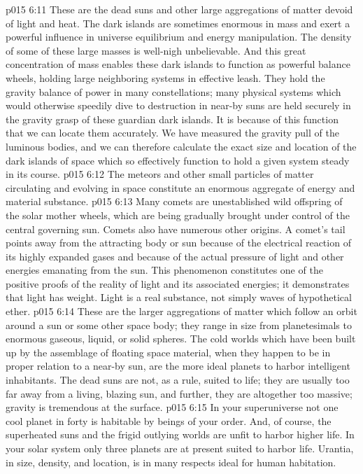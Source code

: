 \vs p015 6:11 \pc {} These are the dead suns and other large aggregations of matter devoid of light and heat. The dark islands are sometimes enormous in mass and exert a powerful influence in universe equilibrium and energy manipulation. The density of some of these large masses is well\hyp{}nigh unbelievable. And this great concentration of mass enables these dark islands to function as powerful balance wheels, holding large neighboring systems in effective leash. They hold the gravity balance of power in many constellations; many physical systems which would otherwise speedily dive to destruction in near\hyp{}by suns are held securely in the gravity grasp of these guardian dark islands. It is because of this function that we can locate them accurately. We have measured the gravity pull of the luminous bodies, and we can therefore calculate the exact size and location of the dark islands of space which so effectively function to hold a given system steady in its course.
\vs p015 6:12 \pc {} The meteors and other small particles of matter circulating and evolving in space constitute an enormous aggregate of energy and material substance.
\vs p015 6:13 Many comets are unestablished wild offspring of the solar mother wheels, which are being gradually brought under control of the central governing sun. Comets also have numerous other origins. A comet’s tail points away from the attracting body or sun because of the electrical reaction of its highly expanded gases and because of the actual pressure of light and other energies emanating from the sun. This phenomenon constitutes one of the positive proofs of the reality of light and its associated energies; it demonstrates that light has weight. Light is a real substance, not simply waves of hypothetical ether.
\vs p015 6:14 \pc {} These are the larger aggregations of matter which follow an orbit around a sun or some other space body; they range in size from planetesimals to enormous gaseous, liquid, or solid spheres. The cold worlds which have been built up by the assemblage of floating space material, when they happen to be in proper relation to a near\hyp{}by sun, are the more ideal planets to harbor intelligent inhabitants. The dead suns are not, as a rule, suited to life; they are usually too far away from a living, blazing sun, and further, they are altogether too massive; gravity is tremendous at the surface.
\vs p015 6:15 In your superuniverse not one cool planet in forty is habitable by beings of your order. And, of course, the superheated suns and the frigid outlying worlds are unfit to harbor higher life. In your solar system only three planets are at present suited to harbor life. Urantia, in size, density, and location, is in many respects ideal for human habitation.
